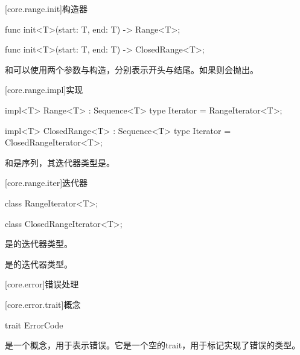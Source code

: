 [core.range.init]{构造器}

\begin{itemdecl}
func init<T>(start: T, end: T) -> Range<T>;
\end{itemdecl}

\begin{itemdecl}
func init<T>(start: T, end: T) -> ClosedRange<T>;
\end{itemdecl}

\pnum
{}和可以使用两个参数与构造，分别表示开头与结尾。如果则会抛出。

[core.range.impl]{实现}

\begin{itemdecl}
impl<T> Range<T> : Sequence<T> {
    type Iterator = RangeIterator<T>;
}
\end{itemdecl}

\begin{itemdecl}
impl<T> ClosedRange<T> : Sequence<T> {
    type Iterator = ClosedRangeIterator<T>;
}
\end{itemdecl}

\pnum
{}和是序列，其迭代器类型是。

[core.range.iter]{迭代器}

\begin{itemdecl}
class RangeIterator<T>;
\end{itemdecl}

\begin{itemdecl}
class ClosedRangeIterator<T>;
\end{itemdecl}

\pnum
{}是的迭代器类型。

\pnum
{}是的迭代器类型。

[core.error]{错误处理}

[core.error.trait]{概念}

\begin{itemdecl}
trait ErrorCode { }
\end{itemdecl}

\pnum
{}是一个概念，用于表示错误。它是一个空的trait，用于标记实现了错误的类型。

